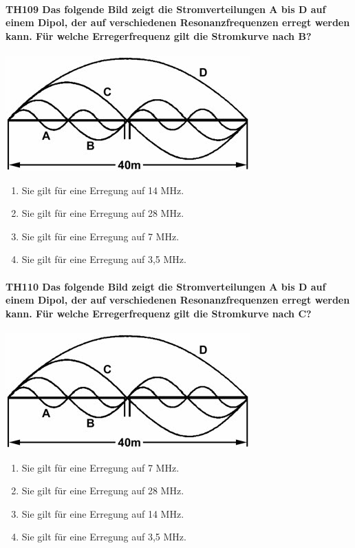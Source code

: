 \documentclass[8pt]{article}
\begin{document}
\paragraph*{TH109 Das folgende Bild zeigt die Stromverteilungen A bis D auf einem Dipol, der auf verschiedenen Resonanzfrequenzen erregt werden kann. Für welche Erregerfrequenz gilt die Stromkurve nach B?}
\begin{center}
	\begin{minipage}{\linewidth}
		\centering
		\includegraphics[scale=1.0]{pics/th109_a.jpg}
	\end{minipage}
\end{center}
\begin{enumerate}[nolistsep,label=\Alph*]
\item Sie gilt für eine Erregung auf 14 MHz.
\item Sie gilt für eine Erregung auf 28 MHz.
\item Sie gilt für eine Erregung auf 7 MHz.
\item Sie gilt für eine Erregung auf 3,5 MHz.
\end{enumerate}

\paragraph*{TH110 Das folgende Bild zeigt die Stromverteilungen A bis D auf einem Dipol, der auf verschiedenen Resonanzfrequenzen erregt werden kann. Für welche Erregerfrequenz gilt die Stromkurve nach C?}
\begin{center}
	\begin{minipage}{\linewidth}
		\centering
		\includegraphics[scale=1.0]{pics/th110_a.jpg}
	\end{minipage}
\end{center}
\begin{enumerate}[nolistsep,label=\Alph*]
\item Sie gilt für eine Erregung auf 7 MHz.
\item Sie gilt für eine Erregung auf 28 MHz.
\item Sie gilt für eine Erregung auf 14 MHz.
\item Sie gilt für eine Erregung auf 3,5 MHz.
\end{enumerate}
\end{document}

